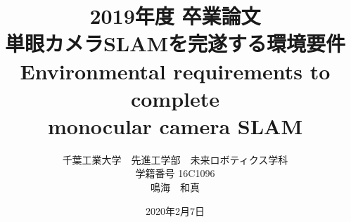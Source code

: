 \documentclass[a4paper,11pt]{jsbook}
\begin{document}
\title{2019年度 卒業論文\\
単眼カメラSLAMを完遂する環境要件\\
Environmental requirements to complete\\
 monocular camera SLAM }

\author{千葉工業大学　先進工学部　未来ロボティクス学科\\
学籍番号 16C1096\\
鳴海　和真}




\date{2020年2月7日}

\maketitle

\clearpage



\tableofcontents



\cleardoublepage
{}


%









\newpage
\printindex
\end{document}
